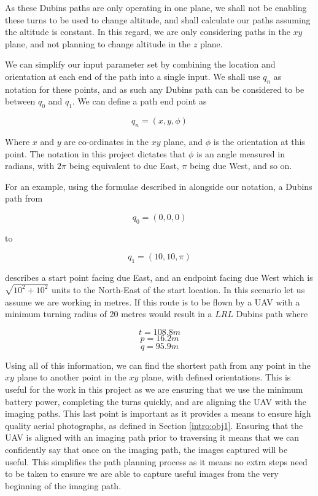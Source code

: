 As these Dubins paths are only operating in one plane, we shall not be enabling these turns to be used to change altitude, and shall calculate our paths assuming the altitude is constant. In this regard, we are only considering paths in the $xy$ plane, and not planning to change altitude in the $z$ plane. 

We can simplify our input parameter set by combining the location and orientation at each end of the path into a single input. We shall use $q_n$ as notation for these points, and as such any Dubins path can be considered to be between $q_0$ and $q_1$. We can define a path end point as 

\begin{equation}
q_n = (x,y,\phi)
\end{equation}

Where $x$ and $y$ are co-ordinates in the $xy$ plane, and $\phi$ is the orientation at this point. The notation in this project dictates that $\phi$ is an angle measured in radians, with $2\pi$ being equivalent to due East, $\pi$ being due West, and so on. 

For an example, using the formulae described in \cite{shkel2001classification} alongside our notation, a Dubins path from

\begin{equation}
q_0 = (0,0,0)
\end{equation}

to

\begin{equation}
q_1 = (10,10,\pi)
\end{equation}

describes a start point facing due East, and an endpoint facing due West which is $\sqrt{10^2 + 10^2}$ units to the North-East of the start location. In this scenario let us assume we are working in metres. If this route is to be flown by a UAV with a minimum turning radius of 20 metres would result in a $LRL$ Dubins path where

\begin{equation}
t = 108.8m 
\end{equation}
\begin{equation}
p = 16.2m 
\end{equation}
\begin{equation}
q = 95.9m 
\end{equation}

Using all of this information, we can find the shortest path from any point in the $xy$ plane to another point in the $xy$ plane, with defined orientations. This is useful for the work in this project as we are ensuring that we use the minimum battery power, completing the turns quickly, and are aligning the UAV with the imaging paths. This last point is important as it provides a means to ensure high quality aerial photographs, as defined in Section \ref{intro:obj1}. Ensuring that the UAV is aligned with an imaging path prior to traversing it means that we can confidently say that once on the imaging path, the images captured will be useful. This simplifies the path planning process as it means no extra steps need to be taken to ensure we are able to capture useful images from the very beginning of the imaging path.

